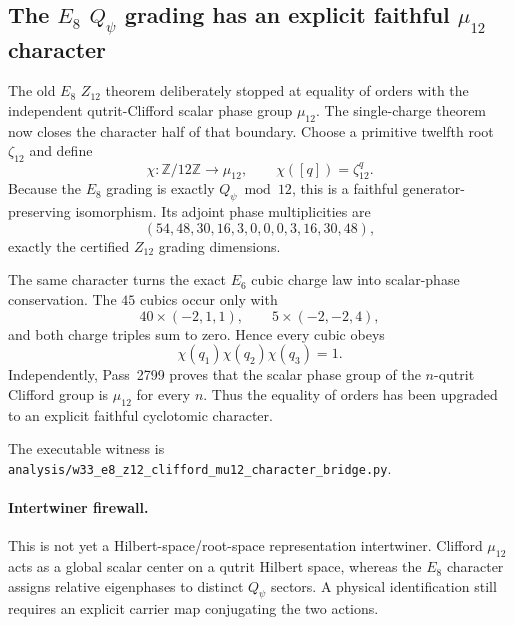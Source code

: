 \subsection*{The $E_8$ $Q_\psi$ grading has an explicit faithful $\mu_{12}$ character}

The old $E_8$ $Z_{12}$ theorem deliberately stopped at equality of orders with
the independent qutrit-Clifford scalar phase group $\mu_{12}$.  The
single-charge theorem now closes the character half of that boundary.  Choose
a primitive twelfth root $\zeta_{12}$ and define
\[
\chi:\mathbb Z/12\mathbb Z\longrightarrow\mu_{12},
\qquad
\chi([q])=\zeta_{12}^{q}.
\]
Because the $E_8$ grading is exactly $Q_\psi\bmod12$, this is a faithful
generator-preserving isomorphism.  Its adjoint phase multiplicities are
\[
(54,48,30,16,3,0,0,0,3,16,30,48),
\]
exactly the certified $Z_{12}$ grading dimensions.

The same character turns the exact $E_6$ cubic charge law into scalar-phase
conservation.  The $45$ cubics occur only with
\[
40\times(-2,1,1),\qquad 5\times(-2,-2,4),
\]
and both charge triples sum to zero.  Hence every cubic obeys
\[
\chi(q_1)\chi(q_2)\chi(q_3)=1.
\]
Independently, Pass~2799 proves that the scalar phase group of the
$n$-qutrit Clifford group is $\mu_{12}$ for every $n$.  Thus the equality of
orders has been upgraded to an explicit faithful cyclotomic character.

The executable witness is
\texttt{analysis/w33\_e8\_z12\_clifford\_mu12\_character\_bridge.py}.

\paragraph{Intertwiner firewall.}
This is not yet a Hilbert-space/root-space representation intertwiner.
Clifford $\mu_{12}$ acts as a global scalar center on a qutrit Hilbert space,
whereas the $E_8$ character assigns relative eigenphases to distinct
$Q_\psi$ sectors.  A physical identification still requires an explicit
carrier map conjugating the two actions.
